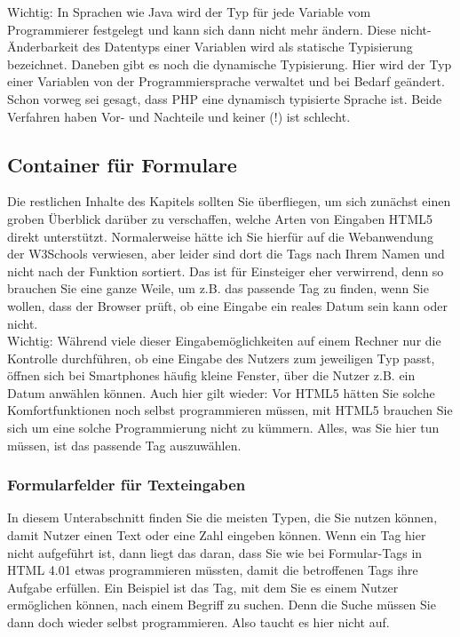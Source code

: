 Wichtig: In Sprachen wie Java wird der Typ für jede Variable vom Programmierer festgelegt und kann sich dann nicht mehr ändern. Diese nicht-Änderbarkeit des Datentyps einer Variablen wird als statische Typisierung bezeichnet. Daneben gibt es noch die dynamische Typisierung. Hier wird der Typ einer Variablen von der Programmiersprache verwaltet und bei Bedarf geändert. Schon vorweg sei gesagt, dass PHP eine dynamisch typisierte Sprache ist. Beide Verfahren haben Vor- und Nachteile und keiner (!) ist schlecht.

\subsection{Container für Formulare}

Die restlichen Inhalte des Kapitels sollten Sie überfliegen, um sich zunächst einen groben Überblick darüber zu verschaffen, welche Arten von Eingaben HTML5 direkt unterstützt. Normalerweise hätte ich Sie hierfür auf die Webanwendung der W3Schools verwiesen, aber leider sind dort die Tags nach Ihrem Namen und nicht nach der Funktion sortiert. Das ist für Einsteiger eher verwirrend, denn so brauchen Sie eine ganze Weile, um z.B. das passende Tag zu finden, wenn Sie wollen, dass der Browser prüft, ob eine Eingabe ein reales Datum sein kann oder nicht.\\

Wichtig: Während viele dieser Eingabemöglichkeiten auf einem Rechner nur die Kontrolle durchführen, ob eine Eingabe des Nutzers zum jeweiligen Typ passt, öffnen sich bei Smartphones häufig kleine Fenster, über die Nutzer z.B. ein Datum anwählen können. Auch hier gilt wieder: Vor HTML5 hätten Sie solche Komfortfunktionen noch selbst programmieren müssen, mit HTML5 brauchen Sie sich um eine solche Programmierung nicht zu kümmern. Alles, was Sie hier tun müssen, ist das passende Tag auszuwählen.

\subsubsection{Formularfelder für Texteingaben}

In diesem Unterabschnitt finden Sie die meisten Typen, die Sie nutzen können, damit Nutzer einen Text oder eine Zahl eingeben können. Wenn ein Tag hier nicht aufgeführt ist, dann liegt das daran, dass Sie wie bei Formular-Tags in HTML 4.01 etwas programmieren müssten, damit die betroffenen Tags ihre Aufgabe erfüllen. Ein Beispiel ist das Tag, mit dem Sie es einem Nutzer ermöglichen können, nach einem Begriff zu suchen. Denn die Suche müssen Sie dann doch wieder selbst programmieren. Also taucht es hier nicht auf.\\

